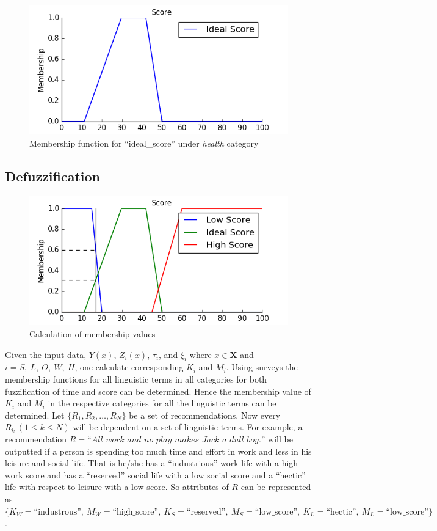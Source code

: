 \documentclass[conference]{IEEEtran}
\newcommand{\quotes}[1]{``#1''}
\begin{document}
\begin{figure}[h!]
\centering
\captionsetup{justification=centering}
\noindent \includegraphics[scale=0.35]{ideal_health}
\caption{Membership function for \quotes{ideal\_score} under \textit{health} category}
\end{figure}
\subsection{Defuzzification}
\begin{figure}[h!]
\centering
\captionsetup{justification=centering}
\noindent \includegraphics[scale=0.35]{health_score}
\caption{Calculation of membership values}
\end{figure}
Given the input data, $Y(x)$, $Z_i(x)$, $\tau_i$, and $\xi_i$ where $x \in \mathbf{X}$ and $i = S,\ L,\ O,\ W,\ H$, one calculate corresponding $K_i$ and $M_i$. Using surveys the membership functions for all linguistic terms in all categories for both fuzzification of time and score can be determined. Hence the membership value of $K_i$ and $M_i$ in the respective categories for all the linguistic terms can be determined. Let $\{R_1, R_2, \ldots, R_N\}$ be a set of recommendations. Now every $R_k\ (1 \leq k \leq N)$ will be dependent on a set of linguistic terms. For example, a recommendation $R = \textit{\quotes{All work and no play makes Jack a dull boy.}}$ will be outputted if a person is spending too much time and effort in work and less in his leisure and social life. That is he/she has a \quotes{industrious} work life with a high work score and has a \quotes{reserved} social life with a low social score and a \quotes{hectic} life with respect to leisure with a low score. So attributes of $R$ can be represented as $\{K_W=\text{\quotes{industrous}},\ M_W=\text{\quotes{high\_score}},\ K_S=\text{\quotes{reserved}},\ M_S=\text{\quotes{low\_score}},\ K_L=\text{\quotes{hectic}},\ M_L=\text{\quotes{low\_score}}\}$.
\end{document}
